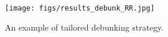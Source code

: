 
\begin{figure}
    \centering
    \texttt{[image: figs/results\_debunk\_RR.jpg]}
    \caption{An example of tailored debunking strategy.}
    \label{fig:debunk}
\end{figure}


